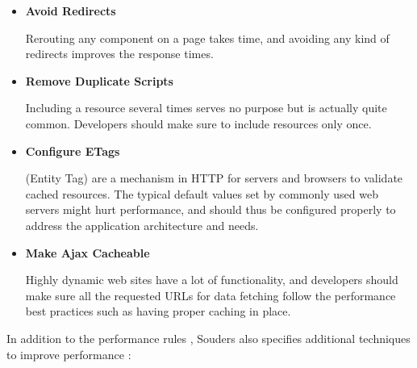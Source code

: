 \begin{itemize}
\item \textbf{Avoid Redirects}

  Rerouting any component on a page takes time, and avoiding any kind
  of redirects improves the response times.

\item \textbf{Remove Duplicate Scripts}

  Including a resource several times serves no purpose but is actually
  quite common. Developers should make sure to include resources only
  once.

\item \textbf{Configure ETags}

   (Entity Tag) are a mechanism in HTTP for servers and
  browsers to validate cached resources. The typical default values
  set by commonly used web servers might hurt performance, and should
  thus be configured properly to address the application architecture
  and needs.

\item \textbf{Make Ajax Cacheable}

  Highly dynamic web sites have a lot of 
  \cite{garrett2005ajax} functionality, and developers should make
  sure all the requested URLs for data fetching follow the performance
  best practices such as having proper caching in place.

\end{itemize}

In addition to the performance rules \cite{souders2007high}, Souders
also specifies additional techniques to improve performance
\cite{souders2009even}:

